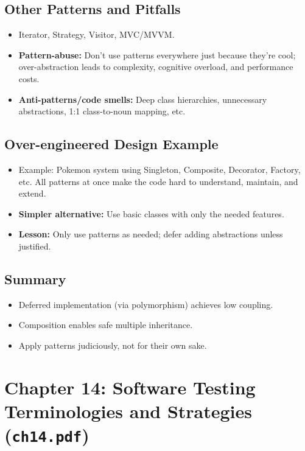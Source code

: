 \documentclass[11pt,a4paper]{article}
\begin{document}
\subsection*{Other Patterns and Pitfalls}
\begin{itemize}
    \item Iterator, Strategy, Visitor, MVC/MVVM.
    \item \textbf{Pattern-abuse:} Don't use patterns everywhere just because they're cool; over-abstraction leads to complexity, cognitive overload, and performance costs.
    \item \textbf{Anti-patterns/code smells:} Deep class hierarchies, unnecessary abstractions, 1:1 class-to-noun mapping, etc.
\end{itemize}

\subsection*{Over-engineered Design Example}
\begin{itemize}
    \item Example: Pokemon system using Singleton, Composite, Decorator, Factory, etc. All patterns at once make the code hard to understand, maintain, and extend.
    \item \textbf{Simpler alternative:} Use basic classes with only the needed features.
    \item \textbf{Lesson:} Only use patterns as needed; defer adding abstractions unless justified.
\end{itemize}

\subsection*{Summary}
\begin{itemize}
    \item Deferred implementation (via polymorphism) achieves low coupling.
    \item Composition enables safe multiple inheritance.
    \item Apply patterns judiciously, not for their own sake.
\end{itemize}

\section{Chapter 14: Software Testing Terminologies and Strategies (\texttt{ch14.pdf})}
\end{document}
